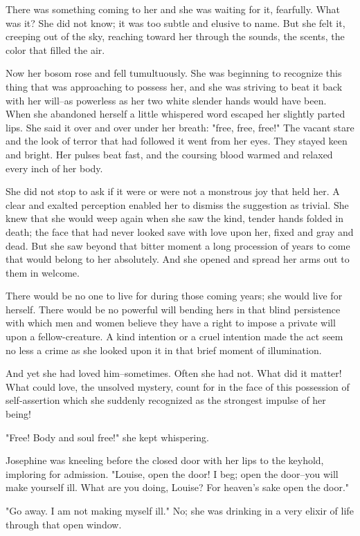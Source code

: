 \documentclass{article}        %
\begin{document}
There was something coming to her and she was waiting for it, fearfully. What was it? She did not know; it was too subtle and elusive to name. But she felt it, creeping out of the sky, reaching toward her through the sounds, the scents, the color that filled the air.

Now her bosom rose and fell tumultuously. She was beginning to recognize this thing that was approaching to possess her, and she was striving to beat it back with her will--as powerless as her two white slender hands would have been. When she abandoned herself a little whispered word escaped her slightly parted lips. She said it over and over under her breath: "free, free, free!" The vacant stare and the look of terror that had followed it went from her eyes. They stayed keen and bright. Her pulses beat fast, and the coursing blood warmed and relaxed every inch of her body. 

She did not stop to ask if it were or were not a monstrous joy that held her. A clear and exalted perception enabled her to dismiss the suggestion as trivial. She knew that she would weep again when she saw the kind, tender hands folded in death; the face that had never looked save with love upon her, fixed and gray and dead. But she saw beyond that bitter moment a long procession of years to come that would belong to her absolutely. And she opened and spread her arms out to them in welcome.

There would be no one to live for during those coming years; she would live for herself. There would be no powerful will bending hers in that blind persistence with which men and women believe they have a right to impose a private will upon a fellow-creature. A kind intention or a cruel intention made the act seem no less a crime as she looked upon it in that brief moment of illumination. 

And yet she had loved him--sometimes. Often she had not. What did it matter! What could love, the unsolved mystery, count for in the face of this possession of self-assertion which she suddenly recognized as the strongest impulse of her being!

"Free! Body and soul free!" she kept whispering.

Josephine was kneeling before the closed door with her lips to the keyhold, imploring for admission. "Louise, open the door! I beg; open the door--you will make yourself ill. What are you doing, Louise? For heaven's sake open the door."

"Go away. I am not making myself ill." No; she was drinking in a very elixir of life through that open window.
\end{document}
